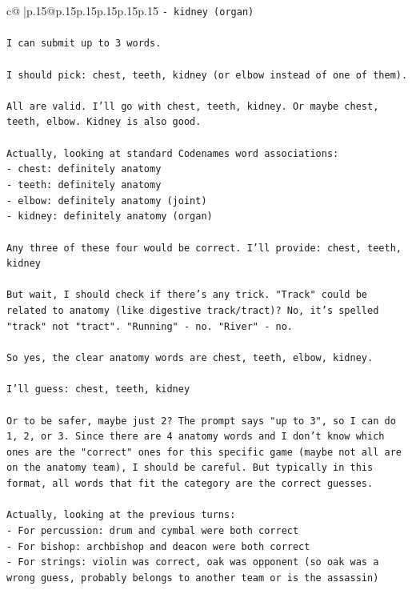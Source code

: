 \documentclass{article}
\begin{document}
{\begin{supertabular}{c@{$\;$}|p{.15\linewidth}@{}p{.15\linewidth}p{.15\linewidth}p{.15\linewidth}p{.15\linewidth}p{.15\linewidth}}
{{{\texttt{{-} kidney (organ)} \\
\\ 
\texttt{I can submit up to 3 words.} \\
\\ 
\texttt{I should pick: chest, teeth, kidney (or elbow instead of one of them).} \\
\\ 
\texttt{All are valid. I'll go with chest, teeth, kidney. Or maybe chest, teeth, elbow. Kidney is also good.} \\
\\ 
\texttt{Actually, looking at standard Codenames word associations:} \\
\texttt{{-} chest: definitely anatomy} \\
\texttt{{-} teeth: definitely anatomy} \\
\texttt{{-} elbow: definitely anatomy (joint)} \\
\texttt{{-} kidney: definitely anatomy (organ)} \\
\\ 
\texttt{Any three of these four would be correct. I'll provide: chest, teeth, kidney} \\
\\ 
\texttt{But wait, I should check if there's any trick. "Track" could be related to anatomy (like digestive track/tract)? No, it's spelled "track" not "tract". "Running" {-} no. "River" {-} no.} \\
\\ 
\texttt{So yes, the clear anatomy words are chest, teeth, elbow, kidney.} \\
\\ 
\texttt{I'll guess: chest, teeth, kidney} \\
\\ 
\texttt{Or to be safer, maybe just 2? The prompt says "up to 3", so I can do 1, 2, or 3. Since there are 4 anatomy words and I don't know which ones are the "correct" ones for this specific game (maybe not all are on the anatomy team), I should be careful. But typically in this format, all words that fit the category are the correct guesses.} \\
\\ 
\texttt{Actually, looking at the previous turns:} \\
\texttt{{-} For percussion: drum and cymbal were both correct} \\
\texttt{{-} For bishop: archbishop and deacon were both correct} \\
\texttt{{-} For strings: violin was correct, oak was opponent (so oak was a wrong guess, probably belongs to another team or is the assassin)} \\
}}}
\end{supertabular}}
\end{document}
